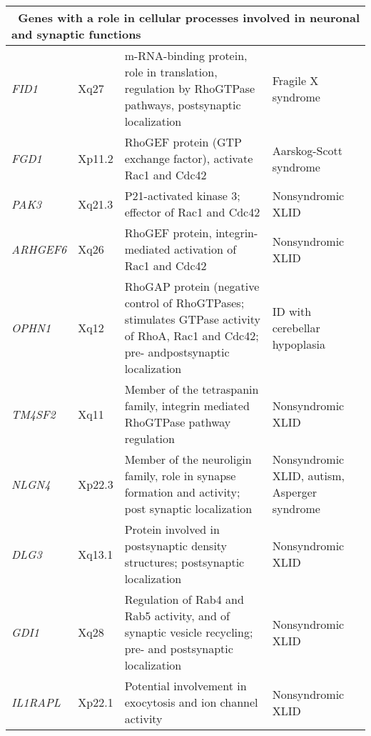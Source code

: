 {\begin{landscape}
\begin{spacing}{0.7}
\begin{longtable}{p{1in} p{1in} p{4.25in} p{2.75in}}
    \multicolumn{4}{l}{\bfseries~Genes with a role in cellular processes involved in neuronal and synaptic functions} \\ \midrule
	\textit{FID1} & Xq27 & m-RNA-binding protein, role in translation, regulation by RhoGTPase pathways, postsynaptic localization & Fragile X syndrome \\ \midrule
	\textit{FGD1} & Xp11.2 & RhoGEF protein (GTP exchange factor), activate Rac1 and Cdc42 & Aarskog-Scott syndrome \\ \midrule
	\textit{PAK3} & Xq21.3 & P21-activated kinase 3; effector of Rac1 and Cdc42 & Nonsyndromic XLID \\ \midrule
	\textit{ARHGEF6} & Xq26 & RhoGEF protein, integrin-mediated activation of Rac1 and Cdc42 & Nonsyndromic XLID \\ \midrule
	\textit{OPHN1} & Xq12 & RhoGAP protein (negative control of RhoGTPases; stimulates GTPase  activity of RhoA, Rac1 and Cdc42; pre- andpostsynaptic localization & ID with cerebellar hypoplasia \\ \midrule
	\textit{TM4SF2} & Xq11 & Member of the tetraspanin family, integrin mediated RhoGTPase pathway regulation & Nonsyndromic XLID \\ \midrule
	\textit{NLGN4} & Xp22.3 & Member of the neuroligin family, role in synapse formation and activity; post synaptic localization & Nonsyndromic XLID, autism, Asperger syndrome \\ \midrule
	\textit{DLG3} & Xq13.1 & Protein involved in postsynaptic density structures; postsynaptic localization & Nonsyndromic XLID \\ \midrule
	\textit{GDI1} & Xq28 & Regulation of Rab4 and Rab5 activity, and of synaptic vesicle recycling; pre- and postsynaptic localization & Nonsyndromic XLID \\ \midrule
	\textit{IL1RAPL} & Xp22.1 & Potential involvement in exocytosis and ion channel activity & Nonsyndromic XLID \\ \midrule
  	

\end{longtable}
\end{spacing}
\end{landscape}}
